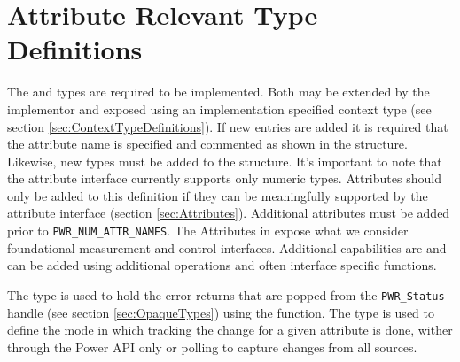 \section{Attribute Relevant Type Definitions}\label{sec:AttributeTypeDefinitions}

The  and  types are required to be implemented. 
Both may be extended by the implementor and exposed using an implementation specified context type (see section \ref{sec:ContextTypeDefinitions}).
If new  entries are added it is required that the attribute name is specified and commented as shown in the  structure.
Likewise, new types must be added to the  structure. 
It's important to note that the attribute interface currently supports only numeric types.
Attributes should only be added to this definition if they can be meaningfully supported by the attribute interface (section \ref{sec:Attributes}).
Additional attributes must be added prior to  \texttt{PWR_NUM_ATTR_NAMES}.
The Attributes in  expose what we consider foundational measurement and control interfaces. 
Additional capabilities are and can be added using additional operations and often interface specific functions.

The  type is used to hold the error returns that are popped from the \texttt{PWR_Status} handle (see section \ref{sec:OpaqueTypes}) using the  function.
The  type is used to define the mode in which tracking the change for a given attribute is done, wither through the Power API only or polling to capture changes from all sources.

